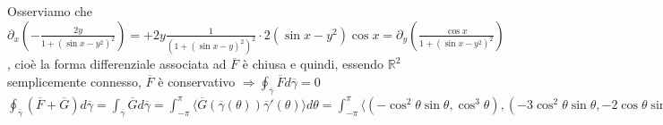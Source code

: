 \documentclass{article}
\newcommand{\R}{\mathbb{R}}
\begin{document}
\begin{enumerate}
    Osserviamo che $\partial_x\left( -\frac{2y}{1+(\sin x - y^2)^2} \right)= +2y \frac{1}{(1+(\sin x - y)^2)^2}\cdot 2 (\sin x - y^2) \cos x = \partial_y \left( \frac{\cos x}{1+(\sin x-y^2)^2} \right)$, cioè la forma differenziale associata ad $\overline{F}$ è chiusa e quindi, essendo $\R^2$ semplicemente connesso, $\overline{F}$ è conservativo $\Rightarrow \oint_{\overline{\gamma}}\overline{F}d\overline{\gamma}=0$\\
    $\oint_{\overline{\gamma}}(\overline{F}+\overline{G})d\overline{\gamma}= \int_{\overline{\gamma}}\overline{G } d\overline{\gamma}=\int_{-\pi}^{\pi}\langle \overline{G}(\overline{\gamma}(\theta))\overline{\gamma}'(\theta) \rangle d\theta=\int_{-\pi}^\pi \langle (-\cos^2 \theta \sin \theta, \cos^3 \theta),(-3 \cos^2 \theta \sin \theta, -2\cos \theta \sin^2 \theta + \cos^3 \theta) \rangle d \theta =\int_{-\pi}^\pi (3\cos^4 \theta \sin^2 \theta - 2 \cos^4 \theta \sin^2 \theta + \cos^6 \theta)d \theta=...$
\end{enumerate}
\end{document}
